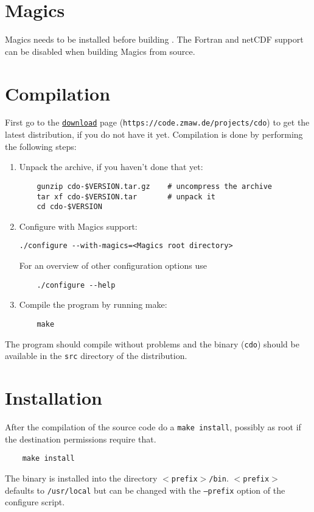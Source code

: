 \section{Magics}
 
Magics needs to be installed before building {\CDO}.
The Fortran and netCDF support can be disabled when building Magics from source.

\section{Compilation}

First go to the {\CDO}  \href{https://code.zmaw.de/projects/cdo}{\tt download} page
({\tt https://code.zmaw.de/projects/cdo}) to get the latest distribution,
if you do not have it yet.
Compilation is done by performing the following steps:

\begin{enumerate}
\item Unpack the archive, if you haven't done that yet:
   
\begin{verbatim}
    gunzip cdo-$VERSION.tar.gz    # uncompress the archive
    tar xf cdo-$VERSION.tar       # unpack it
    cd cdo-$VERSION
\end{verbatim}

\item Configure {\CDO} with Magics support:
 
\begin{verbatim}
./configure --with-magics=<Magics root directory>
\end{verbatim}

For an overview of other configuration options use

\begin{verbatim}
    ./configure --help
\end{verbatim}

\item Compile the program by running make:

\begin{verbatim}
    make
\end{verbatim}

\end{enumerate}

The program should compile without problems and the binary ({\tt cdo}) 
should be available in the {\tt src} directory of the distribution.


\section{Installation}

After the compilation of the source code do a {\tt make install},
possibly as root if the destination permissions require that.

\begin{verbatim}
    make install
\end{verbatim} 

The binary is installed into the directory {\tt $<$prefix$>$/bin}.
{\tt $<$prefix$>$} defaults to {\tt /usr/local} but can be changed with 
the {\tt --prefix} option of the configure script. 
